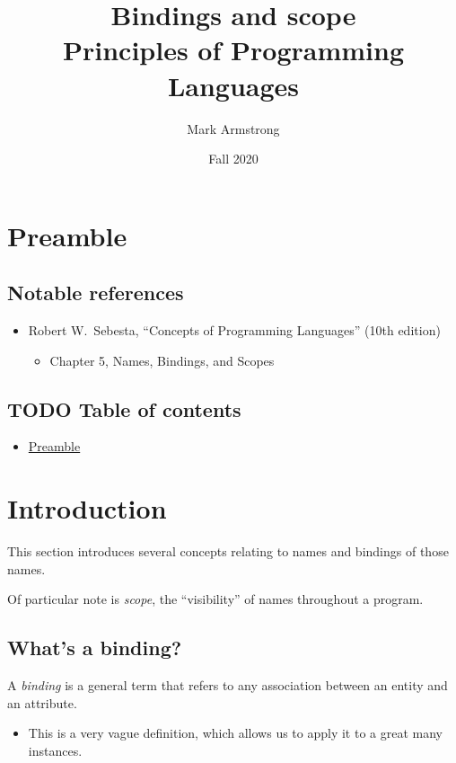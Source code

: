 \documentclass[11pt]{article}
\author{Mark Armstrong}
\date{Fall 2020}
\title{Bindings and scope\\\medskip
\large Principles of Programming Languages}
\theoremstyle{definition}
\begin{document}
\maketitle

\section{Preamble}
\label{sec:org06ee6d7}
\subsection{Notable references}
\label{sec:org8b8c03a}
\begin{itemize}
\item Robert W. Sebesta, “Concepts of Programming Languages” (10th edition)
\begin{itemize}
\item Chapter 5, Names, Bindings, and Scopes
\end{itemize}
\end{itemize}

\subsection{{\bfseries\sffamily TODO} Table of contents}
\label{sec:orge870e59}
\begin{scriptsize}
\begin{itemize}
\item \hyperref[sec:org06ee6d7]{Preamble}
\end{itemize}
\end{scriptsize}

\section{Introduction}
\label{sec:org26d74ec}
This section introduces several concepts
relating to names and bindings of those names.

Of particular note is \emph{scope}, the “visibility” of names
throughout a program.

\subsection{What's a binding?}
\label{sec:orgfd4bfac}
A \emph{binding} is a general term that refers
to any association between an entity and an attribute.
\begin{itemize}
\item This is a very vague definition, which allows us to apply it
to a great many instances.
\end{itemize}
\end{document}
